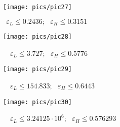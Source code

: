 \begin{figure}[H]
    \centering
    \caption{$~~\varepsilon_L\le0.2436;~~~\varepsilon_H\le0.3151$}
    \texttt{[image: pics/pic27]}
    \label{pic:27}
\end{figure}
\begin{figure}[H]
    \centering
    \caption{~~$\varepsilon_L\le3.727;~~~\varepsilon_H\le0.5776$}
    \texttt{[image: pics/pic28]}
    \label{pic:28}
\end{figure}
\begin{figure}[H]
    \centering
    \caption{~~$\varepsilon_L\le154.833;~~~\varepsilon_H\le0.6443$}
    \texttt{[image: pics/pic29]}
    \label{pic:29}
\end{figure}
\begin{figure}[H]
    \centering
    \caption{~~$\varepsilon_L\le3.24125\cdot10^{6};~~~\varepsilon_H\le0.576293$}
    \texttt{[image: pics/pic30]}
    \label{pic:30}
\end{figure}
